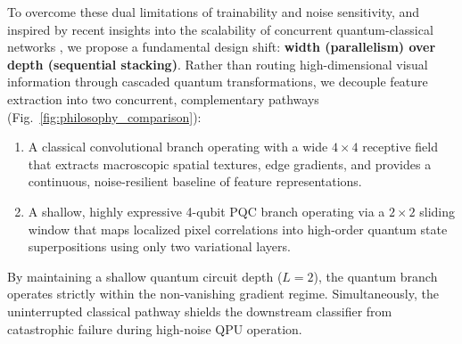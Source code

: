 \documentclass[journal]{IEEEtran}
\begin{document}
To overcome these dual limitations of trainability and noise sensitivity, and inspired by recent insights into the scalability of concurrent quantum-classical networks \cite{kordzanganeh2023parallel}, we propose a fundamental design shift: \textbf{width (parallelism) over depth (sequential stacking)}. Rather than routing high-dimensional visual information through cascaded quantum transformations, we decouple feature extraction into two concurrent, complementary pathways (Fig.~\ref{fig:philosophy_comparison}):
\begin{enumerate}
    \item A classical convolutional branch operating with a wide $4 \times 4$ receptive field that extracts macroscopic spatial textures, edge gradients, and provides a continuous, noise-resilient baseline of feature representations.
    \item A shallow, highly expressive 4-qubit PQC branch operating via a $2 \times 2$ sliding window that maps localized pixel correlations into high-order quantum state superpositions using only two variational layers.
\end{enumerate}

By maintaining a shallow quantum circuit depth ($L=2$), the quantum branch operates strictly within the non-vanishing gradient regime. Simultaneously, the uninterrupted classical pathway shields the downstream classifier from catastrophic failure during high-noise QPU operation.
\end{document}
